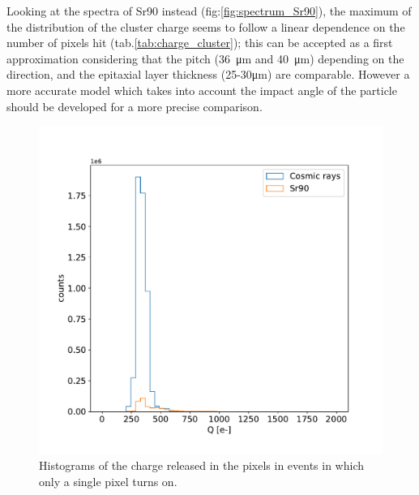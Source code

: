         Looking at the spectra of Sr90 instead (fig:\ref{fig:spectrum_Sr90}), the maximum of the distribution of the cluster charge seems to follow a linear dependence on the number of pixels hit (tab.\ref{tab:charge_cluster}); this can be accepted as a first approximation considering that the pitch (\SI{36}{\um} and \SI{40}{\um}) depending on the direction, and the epitaxial layer thickness (25-30\si{\um}) are comparable. 
        However a more accurate model which takes into account the impact angle of the particle should be developed for a more precise comparison.
        \begin{figure}[h!]
            \centering
            \includegraphics[width=.6\linewidth]{figures/charaterization/background.pdf}
            \caption{Histograms of the charge released in the pixels in events in which only a single pixel turns on.}
            \label{fig:single_pixel_cluster}
        \end{figure}         
